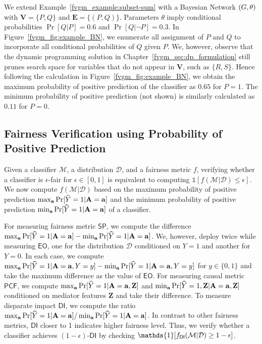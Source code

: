  	 
	\begin{example}
		\normalfont
		We extend Example~\ref{fvgm_example:subset-sum} with a Bayesian Network $ (G, \theta) $ with $ \mathbf{V} = \{P, Q\} $ and $ \mathbf{E} = \{(P,Q)\} $. Parameters $ \theta $ imply conditional probabilities $ \Pr[Q|P] = 0.6 $ and $ \Pr[Q|\neg P] = 0.3 $. 	In Figure~\ref{fvgm_fig:example_BN}, we enumerate all  assignment of $ P $ and $ Q $ to  incorporate all conditional probabilities of $ Q $ given $ P $. We, however, observe that the dynamic programming solution in Chapter~\ref{fvgm_sec:dp_formulation} still prunes search space for variables that do not appear in $ \mathbf{V} $, such as $ \{R, S\} $. Hence following the calculation in Figure~\ref{fvgm_fig:example_BN}, we obtain the maximum probability of positive prediction of the classifier as $ 0.65 $ for $ P = 1 $. The minimum probability of positive prediction (not shown)  is similarly calculated as $ 0.11 $ for $ P = 0 $. 
	\end{example}


	\subsection{Fairness Verification using Probability of Positive Prediction} 
	Given a classifier $\mathcal{M}$, a  distribution $\mathcal{D}$, and a fairness metric $f$, verifying whether a classifier is $\epsilon$-fair for $\epsilon \in [0,1]$ is equivalent to computing $\mathds{1}[f(\mathcal{M}|\mathcal{D})\leq \epsilon]$. We now compute $f(\mathcal{M}|\mathcal{D})$ based on the maximum probability of positive prediction $ \max_{ \mathbf{a}} \Pr[\widehat{Y} =1 | \mathbf{A} = \mathbf{a}] $ and the  minimum probability of positive prediction $ \min_{ \mathbf{a}} \Pr[\widehat{Y} =1 | \mathbf{A} = \mathbf{a}] $ of a classifier.
	
	For measuring fairness metric $ \mathsf{SP} $, we compute the difference $ \max_{ \mathbf{a}} \Pr[\widehat{Y} =1 | \mathbf{A} = \mathbf{a}]  - \min_{ \mathbf{a}} \Pr[\widehat{Y} =1 | \mathbf{A} = \mathbf{a}] $. We, however, deploy {\fvgm} twice while measuring $ \mathsf{EO} $, one for the distribution $ \mathcal{D} $ conditioned on $ Y = 1  $ and another for $ Y = 0 $. In each case, we compute $ \max_{ \mathbf{a}} \Pr[\widehat{Y} =1 | \mathbf{A} = \mathbf{a}, Y = y ]  - \min_{ \mathbf{a}} \Pr[\widehat{Y} =1 | \mathbf{A} = \mathbf{a}, Y = y ] $ for $ y \in \{0,1\} $ and take the  maximum difference as the value of $ \mathsf{EO} $. For measuring causal metric $ \mathsf{PCF} $, we compute  $ \max_{ \mathbf{a}} \Pr[\widehat{Y} =1 | \mathbf{A} = \mathbf{a}, \mathbf{Z}] $ and  $ \min_{ \mathbf{a}} \Pr[\widehat{Y} =1, \mathbf{Z}| \mathbf{A} = \mathbf{a} , \mathbf{Z}] $ conditioned on mediator features $ \mathbf{Z} $ and take their difference. 	To measure disparate impact $ \mathsf{DI} $, we compute the ratio $ \max_{ \mathbf{a}} \Pr[\widehat{Y} =1 | \mathbf{A} = \mathbf{a}] / \min_{ \mathbf{a}} \Pr[\widehat{Y} =1 | \mathbf{A} = \mathbf{a}] $. In contrast to other fairness metrics, $ \mathsf{DI} $ closer to 1 indicates higher fairness level. Thus, we verify whether a classifier achieves $(1 - \epsilon)$-$ \mathsf{DI} $ by checking $ \mathds{1}[f_{\mathsf{DI}}(\alg| \mathcal{D}) \ge 1 - \epsilon] $.
	
